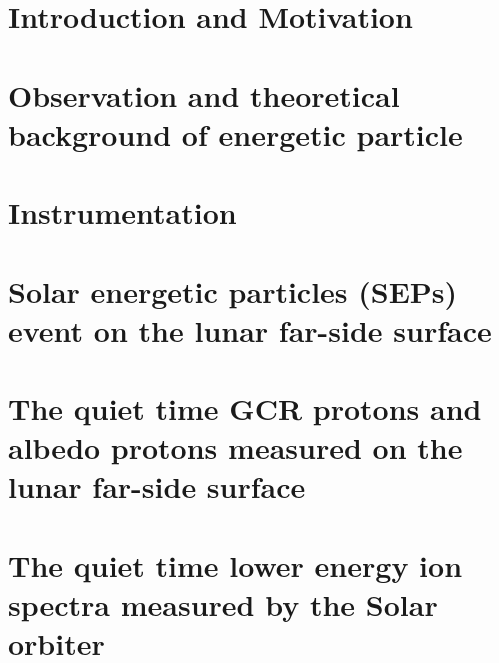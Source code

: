 \documentclass[ twoside,openright,titlepage,numbers=noenddot,headinclude,%
footinclude=true,cleardoublepage=empty,abstractoff, %
BCOR=12mm,paper=a4,fontsize=11pt,%
ngerman,american]{scrreprt} %
\begin{document}
\frenchspacing
\raggedbottom
{} %
\pagestyle{plain}



\cleardoublepage

\cleardoublepage

%
\cleardoublepage



\cleardoublepage
{}
\setcounter{page}{1}


\chapter{Introduction and Motivation} 
\label{chp:introduction}


\chapter{Observation and theoretical background of energetic particle}


\chapter{Instrumentation}
\label{chp:instruments}



\chapter{Solar energetic particles (SEPs) event on the lunar far-side surface}
\label{chp:LND_SEP}



\chapter{The quiet time GCR protons and albedo protons measured on the lunar far-side surface}
\label{chp:LND_GCR_albedo}



\chapter{The quiet time lower energy ion spectra measured by the Solar orbiter}
\label{chp:SOLO_Quite_time}
\end{document}
